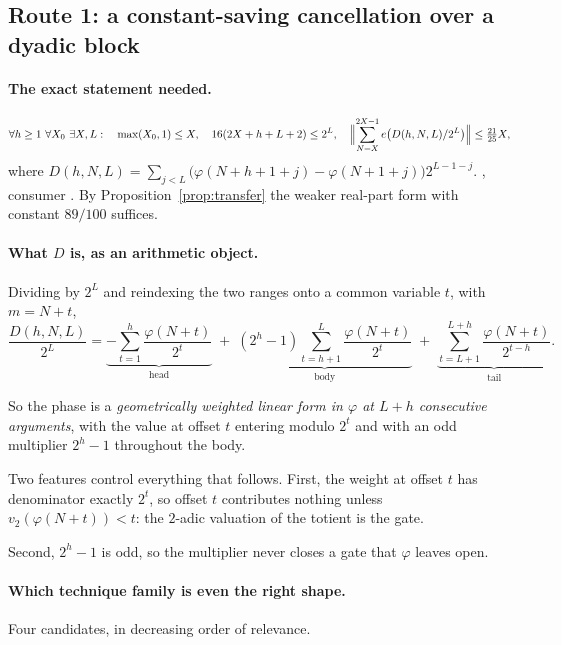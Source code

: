 \subsection{Route 1: a constant-saving cancellation over a dyadic block}

\paragraph{The exact statement needed.}
\[
  \forall h\ge 1\ \forall X_0\ \exists X,L:\quad
  \max(X_0,1)\le X,\quad 16(2X+h+L+2)\le 2^{L},\quad
  \Bigl\|\sum_{N=X}^{2X-1} e\bigl(D(h,N,L)/2^{L}\bigr)\Bigr\|\le \tfrac{21}{25}X,
\]
where $D(h,N,L)=\sum_{j<L}\bigl(\varphi(N+h+1+j)-\varphi(N+1+j)\bigr)2^{L-1-j}$.
,
consumer
\quad {} \quad {}. By Proposition~\ref{prop:transfer} the
weaker real-part form with constant $89/100$ suffices.

\paragraph{What $D$ is, as an arithmetic object.}
Dividing by $2^L$ and reindexing the two ranges onto a common variable
$t$, with $m=N+t$,
\begin{equation}\label{eq:window}
  \frac{D(h,N,L)}{2^{L}}
  =\underbrace{-\sum_{t=1}^{h}\frac{\varphi(N+t)}{2^{t}}}_{\text{head}}
  \;+\;\underbrace{(2^{h}-1)\sum_{t=h+1}^{L}\frac{\varphi(N+t)}{2^{t}}}_{\text{body}}
  \;+\;\underbrace{\sum_{t=L+1}^{L+h}\frac{\varphi(N+t)}{2^{t-h}}}_{\text{tail}} .
\end{equation}

So the phase is a \emph{geometrically weighted linear form in $\varphi$ at
$L+h$ consecutive arguments}, with the value at offset $t$ entering modulo
$2^{t}$ and with an odd multiplier $2^h-1$ throughout the body.

Two features control everything that follows. First, the weight at offset $t$ has
denominator exactly $2^{t}$, so offset $t$ contributes nothing unless
$v_2(\varphi(N+t))<t$: the $2$-adic valuation of the totient is the gate.

Second, $2^h-1$ is odd, so the multiplier never closes a gate that
$\varphi$ leaves open.

\paragraph{Which technique family is even the right shape.}
Four candidates, in decreasing order of relevance.

